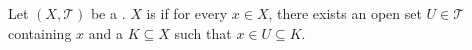 \begin{definition} \label{definition:locally_compact_topological_space}
Let $(X, \mathcal{T})$ be a . $X$ is  if for every $x \in X$, there exists an open set $U \in \mathcal{T}$ containing $x$ and a  $K \subseteq X$ such that $x \in U \subseteq K$.
\end{definition}